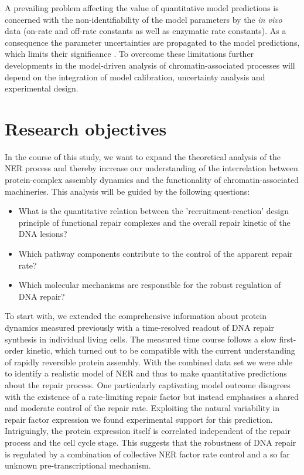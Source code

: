 A prevailing problem affecting the value of quantitative model predictions is concerned with the non-identifiability of the model parameters by the \textit{in vivo} data (on-rate and off-rate constants as well as enzymatic rate constants). As a consequence the parameter uncertainties are propagated to the model predictions, which limits their significance \cite{Raue2013}. To overcome these limitations further developments in the model-driven analysis of chromatin-associated processes will depend on the integration of model calibration, uncertainty analysis and experimental design.     
  

\section{Research objectives}

In the course of this study, we want to expand the theoretical analysis of the NER process and thereby increase our understanding of the interrelation between protein-complex assembly dynamics and the functionality of chromatin-associated machineries. This analysis will be guided by the following questions:

\begin{itemize}
	\item What is the quantitative relation between the 'recruitment-reaction' design principle of functional repair complexes and the overall repair kinetic of the DNA lesions?
	
	\item Which pathway components contribute to the control of the apparent repair rate? 
	
	\item Which molecular mechanisms are responsible for the robust regulation of DNA repair? 
\end{itemize} 

To start with, we extended the comprehensive information about protein dynamics measured previously with a time-resolved readout of DNA repair synthesis in individual living cells. The measured time course follows a slow first-order kinetic, which turned out to be compatible with the current understanding of rapidly reversible protein assembly. With the combined data set we were able to identify a realistic model of NER and thus to make quantitative predictions about the repair process. One particularly captivating model outcome disagrees with the existence of a rate-limiting repair factor but instead emphasises a shared and moderate control of the repair rate. Exploiting the natural variability in repair factor expression we found experimental support for this prediction. Intriguingly, the protein expression itself is correlated independent of the repair process and the cell cycle stage. This suggests that the robustness of DNA repair is regulated by a combination of collective NER factor rate control and a so far unknown pre-transcriptional mechanism.   







